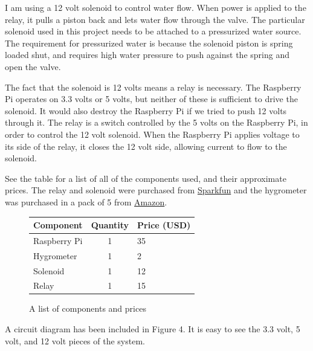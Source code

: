 \documentclass[11pt] {article}
\begin{document}
I am using a 12 volt solenoid to control water flow. When power is applied to the relay, it pulls a piston back and
lets water flow through the valve. The particular solenoid used in this project needs to be attached to a pressurized
water source. The requirement for pressurized water is because the solenoid piston is spring loaded shut, and requires
high water pressure to push against the spring and open the valve.

The fact that the solenoid is 12 volts means a relay is necessary. The Raspberry Pi operates on 3.3 volts or 5 volts,
but neither of these is sufficient to drive the solenoid. It would also destroy the Raspberry Pi if we tried to push
12 volts through it. The relay is a switch controlled by the 5 volts on the Raspberry Pi, in order to control the 12
volt solenoid. When the Raspberry Pi applies voltage to its side of the relay, it closes the 12 volt side, allowing
current to flow to the solenoid.

See the table for a list of all of the components used, and their approximate prices. The relay and solenoid were
purchased from \href{www.sparkfun.com}{Sparkfun} and the hygrometer was purchased in a pack of 5 from
\href{www.amazon.com}{Amazon}.

\begin{figure}
    \begin{center}
        \begin{tabular}{ | l | c | l | }
            \hline
            Component & Quantity & Price (USD) \\
            \hline \hline
            Raspberry Pi & 1 & 35 \\ \hline
            Hygrometer & 1 & 2 \\ \hline
            Solenoid & 1 & 12 \\ \hline
            Relay & 1 & 15 \\ \hline
        \end{tabular}
        \caption{A list of components and prices}
    \end{center}
\end{figure}

A circuit diagram has been included in Figure 4. It is easy to see the 3.3 volt, 5 volt, and 12 volt pieces of the system.
\end{document}
